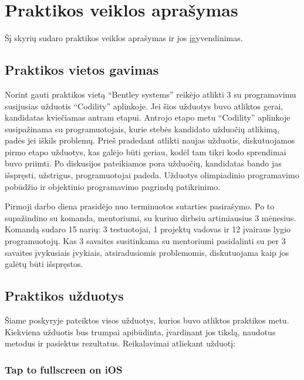 \section{Praktikos veiklos aprašymas}
Šį skyrių sudaro praktikos veiklos aprašymas ir jos įgyvendinimas.

\subsection{Praktikos vietos gavimas}
Norint gauti praktikos vietą \enquote{Bentley systems} reikėjo atlikti 3 su programavimu susijusias užduotis \enquote{Codility} aplinkoje. Jei šios užduotys buvo atliktos gerai, kandidatas kviečiamas antram etapui. Antrojo etapo metu \enquote{Codility} aplinkoje susipažinama su programuotojais, kurie stebės kandidato užduočių atlikimą, padės jei iškils problemų. Prieš pradedant atlikti naujas užduotis, diskutuojamos pirmo etapo užduotys, kas galėjo būti geriau, kodėl tam tikri kodo sprendimai buvo priimti. Po diskusijos pateikiamos pora užduočių, kandidatas bando jas išspręsti, užstrigus, programuotojai padeda. Užduotys olimpiadinio programavimo pobūdžio ir objektinio programavimo pagrindų patikrinimo.

Pirmoji darbo diena prasidėjo nuo terminuotos sutarties pasirašymo. Po to supažindino su komanda, mentoriumi, su kuriuo dirbsiu artimiausius 3 mėnesius. Komandą sudaro 15 narių: 3 testuotojai, 1 projektų vadovas ir 12 įvairaus lygio programuotojų. Kas 3 savaites susitinkama su mentoriumi pasidalinti su per 3 savaites įvykusiais įvykiais, atsiradusiomis problemomis, diskutuojama kaip jos galėtų būti išspręstos.

\subsection{Praktikos užduotys}

Šiame poskyryje pateiktos visos užduotys, kurios buvo atliktos praktikos metu. Kiekviena užduotis bus trumpai apibūdinta, įvardinant jos tikslą, naudotus metodus ir pasiektus rezultatus.
Reikalavimai atliekant užduotį:

\subsubsection{Tap to fullscreen on iOS}

